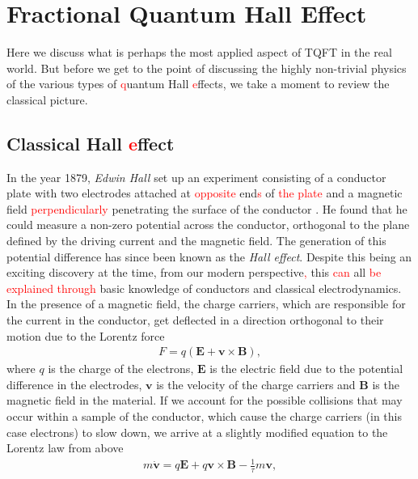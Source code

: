         \section{Fractional Quantum Hall Effect} \label{FQHE_sec}
        Here we discuss what is perhaps the most applied aspect of TQFT in the real world. But before we get to the point of discussing the highly non-trivial physics of the various types of \textcolor{red}{q}uantum Hall \textcolor{red}{e}ffects, we take a moment to review the classical picture.
        \subsection{Classical Hall \textcolor{red}{e}ffect}
        In the year 1879, \textit{Edwin Hall} \cite{Hall1879} set up an experiment consisting of a conductor plate with two electrodes attached at \textcolor{red}{opposite} end\textcolor{red}{s} of \textcolor{red}{the plate} \colorbox{red}{ } and a magnetic field \textcolor{red}{perpendicularly} penetrating the surface of the conductor \colorbox{red}{ }. He found that he could measure a non-zero potential across the conductor, orthogonal to the plane defined by the driving current and the magnetic field. The generation of this potential difference has since been known as the \textit{Hall effect}. Despite this being an exciting discovery at the time, from our modern perspective\textcolor{red}{,} this \textcolor{red}{can} all \textcolor{red}{be explained through} basic knowledge of conductors and classical electrodynamics. In the presence of a magnetic field, the charge carriers, which are responsible for the current in the conductor, get deflected in a direction orthogonal to their motion due to the Lorentz force
        \begin{align}
            F = q(\bm{E} + \bm{v}\times \bm{B}),
        \end{align}
        where $q$ is the charge of the electrons, $\bm{E}$ is the electric field due to the potential difference in the electrodes, $\bm{v}$ is the velocity of the charge carriers and $\bm{B}$ is the magnetic field in the material. If we \colorbox{red}{ } account for the possible collisions that may occur within a sample of the conductor, which \colorbox{red}{ } cause the charge carriers (in this case electrons) to slow down, we \colorbox{red}{ } arrive at a slightly modified equation to the Lorentz law from above
        \begin{align}
            m \dot{\bm{v}} = q \bm{E}+q \bm{v}\times \bm{B} - \frac{1}{\tau} m \bm{v}, \label{eq:Drude_Model_Background}
        \end{align}
